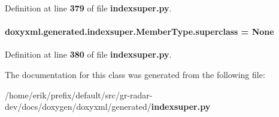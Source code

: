 Definition at line {\bf 379} of file {\bf indexsuper.\+py}.

\paragraph[{superclass}]{\setlength{\rightskip}{0pt plus 5cm}doxyxml.\+generated.\+indexsuper.\+Member\+Type.\+superclass = None\hspace{0.3cm}{\ttfamily [static]}}\label{classdoxyxml_1_1generated_1_1indexsuper_1_1MemberType_aff7a8bbf396bbd1960e60efc7d7d9c55}


Definition at line {\bf 380} of file {\bf indexsuper.\+py}.



The documentation for this class was generated from the following file\+:\begin{DoxyCompactItemize}
\item 
/home/erik/prefix/default/src/gr-\/radar-\/dev/docs/doxygen/doxyxml/generated/{\bf indexsuper.\+py}\end{DoxyCompactItemize}
